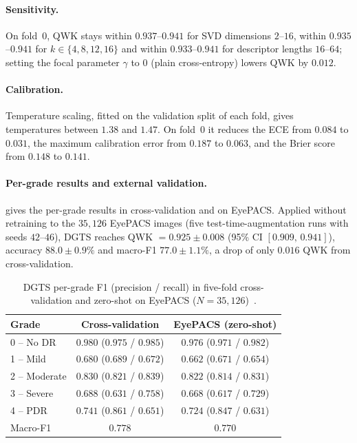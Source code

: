 \paragraph{Sensitivity.}
On fold~0, QWK stays within $0.937$--$0.941$ for SVD dimensions $2$--$16$, within
$0.935$--$0.941$ for $k\in\{4,8,12,16\}$ and within $0.933$--$0.941$ for descriptor lengths
$16$--$64$; setting the focal parameter $\gamma$ to $0$ (plain cross-entropy) lowers QWK by
$0.012$.

\paragraph{Calibration.}
Temperature scaling, fitted on the validation split of each fold, gives temperatures
between $1.38$ and $1.47$. On fold~0 it reduces the ECE from $0.084$ to $0.031$, the maximum
calibration error from $0.187$ to $0.063$, and the Brier score from $0.148$ to $0.141$.

\paragraph{Per-grade results and external validation.}
 gives the per-grade results in cross-validation and on EyePACS.
Applied without retraining to the $35{,}126$ EyePACS images (five test-time-augmentation
runs with seeds $42$--$46$), DGTS reaches QWK $=0.925\pm0.008$ (95\% CI $[0.909,\,0.941]$),
accuracy $88.0\pm0.9\%$ and macro-F1 $77.0\pm1.1\%$, a drop of only $0.016$ QWK from
cross-validation.

\begin{table}[!htbp]
\centering
\caption[DGTS per-grade results in cross-validation and on EyePACS]{DGTS per-grade F1
(precision / recall) in five-fold cross-validation and zero-shot on EyePACS
($N=35{,}126$)~\cite{belhadj2026dgts}.}
\label{tab:dgts-grade}
\small
\begin{tabular}{@{}lcc@{}}
\toprule
Grade & Cross-validation & EyePACS (zero-shot) \\
\midrule
0 -- No DR & $0.980$ ($0.975$ / $0.985$) & $0.976$ ($0.971$ / $0.982$) \\
1 -- Mild & $0.680$ ($0.689$ / $0.672$) & $0.662$ ($0.671$ / $0.654$) \\
2 -- Moderate & $0.830$ ($0.821$ / $0.839$) & $0.822$ ($0.814$ / $0.831$) \\
3 -- Severe & $0.688$ ($0.631$ / $0.758$) & $0.668$ ($0.617$ / $0.729$) \\
4 -- PDR & $0.741$ ($0.861$ / $0.651$) & $0.724$ ($0.847$ / $0.631$) \\
\midrule
Macro-F1 & $0.778$ & $0.770$ \\
\bottomrule
\end{tabular}
\end{table}

